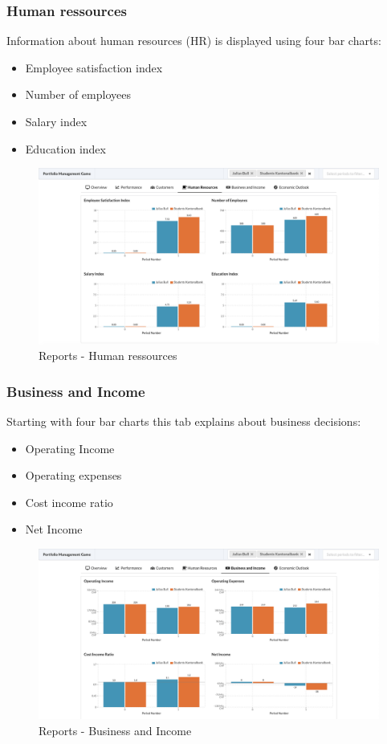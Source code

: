 \subsubsection{Human ressources}
Information about human resources (HR) is displayed using four bar charts:
\begin{itemize}
  \setlength\itemsep{0.01em}
  \item Employee satisfaction index
  \item Number of employees
  \item Salary index
  \item Education index
\end{itemize}
\begin{figure}[h!]
  \centering
  \includegraphics[scale=0.2]{img/application-overview/reports/04_hr.png}
  \caption{Reports - Human ressources}
\end{figure}

\subsubsection{Business and Income}
Starting with four bar charts this tab explains about business decisions:
\begin{itemize}
  \setlength\itemsep{0.01em}
  \item Operating Income
  \item Operating expenses
  \item Cost income ratio
  \item Net Income
\end{itemize}
\begin{figure}[h!]
  \centering
  \includegraphics[scale=0.2]{img/application-overview/reports/05_business_income.png}
  \caption{Reports - Business and Income}
\end{figure}

